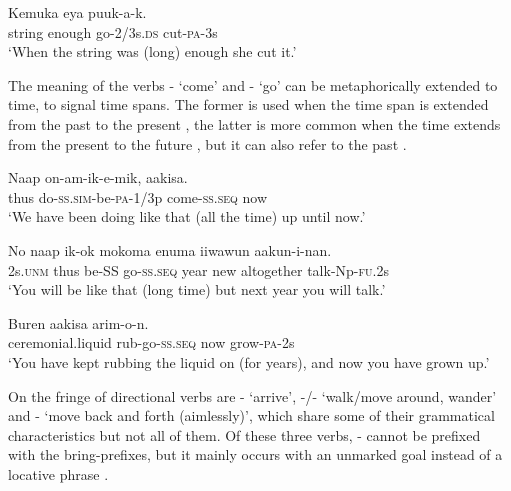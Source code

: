 \ea%
\label{ex:3:x289}
\gll Kemuka  eya puuk-a-k. \\
string enough go-2/3s.\textsc{ds} cut-\textsc{pa}-3s \\
\glt`When the string was (long) enough she cut it.'
\z

The meaning of the verbs - `come' and - `go' can be metaphorically extended to time, to signal time spans. The former is used when the time span is extended from the past to the present , the latter is more common when the time extends from the present to the future , but it can also refer to the past .

\ea%
\label{ex:3:x290}
\gll Naap on-am-ik-e-mik,   aakisa. \\
thus do-\textsc{ss}.\textsc{sim}-be-\textsc{pa}-1/3p come-\textsc{ss}.\textsc{seq} now\\
\glt`We have been doing like that (all the time) up until now.'
\z

\ea%
\label{ex:3:x437}
\gll No naap ik-ok  mokoma enuma iiwawun aakun-i-nan.\\
2s.\textsc{unm} thus be-SS go-\textsc{ss}.\textsc{seq} year new altogether talk-Np-\textsc{fu}.2s\\
\glt`You will be like that (long time) but next year you will talk.'
\z

\ea%
\label{ex:3:x291}
\gll Buren \textstyleEmphasizedVernacularWords{(}\textstyleEmphasizedVernacularWords{)} aakisa arim-o-n. \\
ceremonial.liquid rub-go-\textsc{ss}.\textsc{seq} now grow-\textsc{pa}-2s \\
\glt`You have kept rubbing the \textit{} liquid on (for years), and now you have grown up.'
\z

On the fringe of directional verbs are - `arrive', -/- `walk/move around, wander' and - `move back and forth (aimlessly)', which share some of their grammatical characteristics but not all of them. Of these three verbs, - cannot be prefixed with the bring-prefixes, but it mainly occurs with an unmarked goal instead of a locative phrase .

